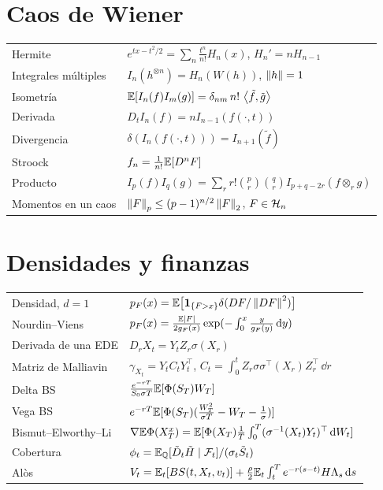 \section*{Caos de Wiener}
\begin{center}
\renewcommand{\arraystretch}{1.25}
\begin{tabular}{p{4.2cm}p{9.5cm}}
\toprule
Hermite & $e^{tx-t^2/2}=\sum_n\frac{t^n}{n!}H_n(x)$, $H_n'=nH_{n-1}$\\
Integrales múltiples & $I_n(h^{\otimes n})=H_n(W(h))$, $\left\lVert h\right\rVert=1$\\
Isometría & $\mathbb{E}[I_n(f)I_m(g)]=\delta_{nm}\,n!\,\left\langle \tilde f, \tilde g\right\rangle$\\
Derivada & $D_tI_n(f)=nI_{n-1}(f(\cdot,t))$\\
Divergencia & $\delta(I_n(f(\cdot,t)))=I_{n+1}(\tilde f)$\\
Stroock & $f_n=\frac1{n!}\mathbb{E}[D^nF]$\\
Producto & $I_p(f)I_q(g)=\sum_rr!\binom pr\binom qrI_{p+q-2r}(f\otimes_rg)$\\
Momentos en un caos & $\left\lVert F\right\rVert_p\le(p-1)^{n/2}\left\lVert F\right\rVert_2$, $F\in\mathcal{H}_n$\\
\bottomrule
\end{tabular}
\end{center}

\section*{Densidades y finanzas}
\begin{center}
\renewcommand{\arraystretch}{1.35}
\begin{tabular}{p{4.2cm}p{9.5cm}}
\toprule
Densidad, $d=1$ & $p_F(x)=\mathbb{E}\big[\mathbf{1}_{\{F>x\}}\delta(DF/\left\lVert DF\right\rVert^2)\big]$\\
Nourdin--Viens & $p_F(x)=\frac{\mathbb{E}\left\lvert F\right\rvert}{2g_F(x)}\exp(-\int_0^x\frac{y}{g_F(y)}\,\mathrm{d} y)$\\
Derivada de una EDE & $D_rX_t=Y_tZ_r\sigma(X_r)$\\
Matriz de Malliavin & $\gamma_{X_t}=Y_tC_tY_t^\top$, $C_t=\int_0^tZ_r\sigma\sigma^\top(X_r)Z_r^\top\,\dd r$\\
Delta BS & $\frac{e^{-rT}}{S_0\sigma T}\mathbb{E}[\Phi(S_T)W_T]$\\
Vega BS & $e^{-rT}\mathbb{E}[\Phi(S_T)(\frac{W_T^2}{\sigma T}-W_T-\frac1\sigma)]$\\
Bismut--Elworthy--Li & $\nabla\mathbb{E}\Phi(X_T^x)=\mathbb{E}[\Phi(X_T)\frac1T\int_0^T(\sigma^{-1}(X_t)Y_t)^\top\,\mathrm{d} W_t]$\\
Cobertura & $\phi_t=\mathbb{E}_{\mathbb{Q}}[\tilde D_t\tilde H\mid\mathcal{F}_t]/(\sigma_t\tilde S_t)$\\
Alòs & $V_t=\mathbb{E}_t[BS(t,X_t,v_t)]+\frac\rho2\mathbb{E}_t\int_t^Te^{-r(s-t)}H\Lambda_s\,\mathrm{d} s$\\
\bottomrule
\end{tabular}
\end{center}
